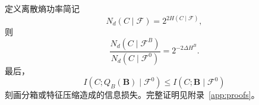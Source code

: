 定义离散熵功率简记
\begin{equation}
N_d(C\mid\mathcal F)=2^{2H(C\mid\mathcal F)},
\label{eq:discrete_entropy_power}
\end{equation}
则
\begin{equation}
\frac{N_d(C\mid\mathcal F^B)}
{N_d(C\mid\mathcal F^0)}
=2^{-2\Delta H^B}.
\label{eq:cmi_entropy_power_ratio}
\end{equation}
最后，
\begin{equation}
I(C;Q_B(\mathbf B)\mid\mathcal F^0)
\leq I(C;\mathbf B\mid\mathcal F^0)
\label{eq:bicycle_data_processing}
\end{equation}
刻画分箱或特征压缩造成的信息损失。完整证明见附录~\ref{app:proofs}。
